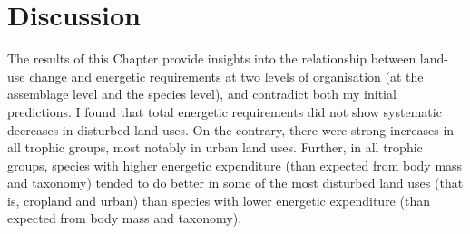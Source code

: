 \section{Discussion}

The results of this Chapter provide insights into the relationship between land-use change and energetic requirements at two levels of organisation (at the assemblage level and the species level), and contradict both my initial predictions. I found that total energetic requirements did not show systematic decreases in disturbed land uses. On the contrary, there were strong increases in all trophic groups, most notably in urban land uses. Further, in all trophic groups, species with higher energetic expenditure (than expected from body mass and taxonomy) tended to do better in some of the most disturbed land uses (that is, cropland and urban) than species with lower energetic expenditure (than expected from body mass and taxonomy).

